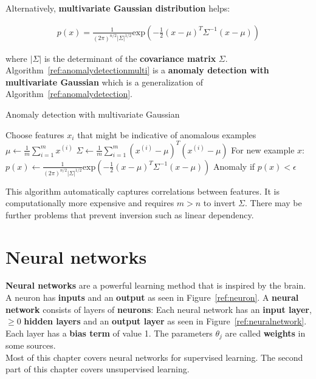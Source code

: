\documentclass{report}
\begin{document}
Alternatively, {\bf multivariate Gaussian distribution} helps:

\begin{align*}
p(x)=\frac{1}{(2\pi)^{n/2}\vert \Sigma \vert ^{1/2}}\mbox{exp}(-\frac{1}{2}(x-\mu)^T \Sigma^{-1}(x-\mu))
\end{align*}

where $\vert \Sigma \vert$ is the determinant of the {\bf covariance matrix} $\Sigma$. Algorithm~\ref{ref:anomalydetectionmulti} is a {\bf anomaly detection with multivariate Gaussian} which is a generalization of Algorithm~\ref{ref:anomalydetection}.

\begin{algorithm}
\caption{Anomaly detection with multivariate Gaussian}
\label{ref:anomalydetectionmulti}
\begin{algorithmic}
\State Choose features $x_i$ that might be indicative of anomalous examples
\State $\mu \gets \frac{1}{m}\sum_{i=1}^m x^{(i)}$
\State $\Sigma \gets \frac{1}{m}\sum_{i=1}^m(x^{(i)}-\mu)^T(x^{(i)}-\mu)$
\State For new example $x$: $p(x) \gets \frac{1}{(2\pi)^{n/2}\vert \Sigma \vert ^{1/2}}\mbox{exp}(-\frac{1}{2}(x-\mu)^T \Sigma^{-1}(x-\mu))$ 
\State Anomaly if $p(x) < \epsilon$
\end{algorithmic}
\end{algorithm}

This algorithm automatically captures correlations between features. It is computationally more expensive and requires $m>n$ to invert $\Sigma$. There may be further problems that prevent inversion such as linear dependency.


\chapter{Neural networks}
\label{chapter:neuralnetworks}
{\bf Neural networks} are a powerful learning method that is inspired by the brain.
A neuron has {\bf inputs} and an {\bf output} as seen in Figure~\ref{ref:neuron}.
A {\bf neural network} consists of layers of {\bf neurons}:
Each neural network has an {\bf input layer}, $\ge 0$ {\bf hidden layers} and an {\bf output layer} as seen in Figure~\ref{ref:neuralnetwork}.
Each layer has a {\bf bias term} of value 1. The parameters $\theta_j$ are called {\bf weights} in some sources. \\
Most of this chapter covers neural networks for supervised learning. The second part of this chapter covers unsupervised learning.
\end{document}

